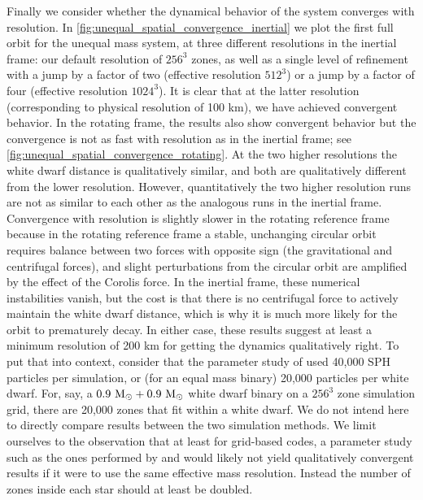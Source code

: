 \documentclass[12pt]{article}
\begin{document}
Finally we consider whether the dynamical behavior of the system converges with resolution.
In \autoref{fig:unequal_spatial_convergence_inertial} we plot the first full orbit for
the unequal mass system, at three different resolutions in the inertial frame: our default
resolution of $256^3$ zones, as well as a single level of refinement with a jump by a factor of
two (effective resolution $512^3$) or a jump by a factor of four (effective resolution $1024^3$).
It is clear that at the latter resolution (corresponding to physical resolution of 100 km),
we have achieved convergent behavior. In the rotating frame, the results also show
convergent behavior but the convergence is not as fast with resolution as in the inertial frame;
see \autoref{fig:unequal_spatial_convergence_rotating}. At the two higher resolutions the white dwarf
distance is qualitatively similar, and both are qualitatively different from the lower resolution. However,
quantitatively the two higher resolution runs are not as similar to each other as the analogous runs in the
inertial frame. Convergence with resolution is slightly slower in the rotating reference frame
because in the rotating reference frame a stable, unchanging circular orbit requires balance between
two forces with opposite sign (the gravitational and centrifugal forces), and slight perturbations from the
circular orbit are amplified by the effect of the Corolis force. In the inertial frame, these numerical instabilities
vanish, but the cost is that there is no centrifugal force to actively maintain the white dwarf distance,
which is why it is much more likely for the orbit to prematurely decay. In either case, these results suggest
at least a minimum resolution of 200 km for getting the dynamics qualitatively right. To put that into context,
consider that the parameter study of \citet{dan:2014} used 40,000 SPH particles per simulation, or (for an equal mass
binary) 20,000 particles per white dwarf. For, say, a $0.9\ \mathrm{M}_\odot + 0.9\ \mathrm{M}_\odot$ white dwarf binary on
a $256^3$ zone simulation grid, there are 20,000 zones that fit within a white dwarf. We do not
intend here to directly compare results between the two simulation methods. We limit ourselves to the
observation that at least for grid-based codes, a parameter study such as the ones performed by
\citet{dan:2012} and \citet{dan:2014} would likely not yield qualitatively convergent results if it were to use the
same effective mass resolution. Instead the number of zones inside each star should at least be doubled.
\end{document}

